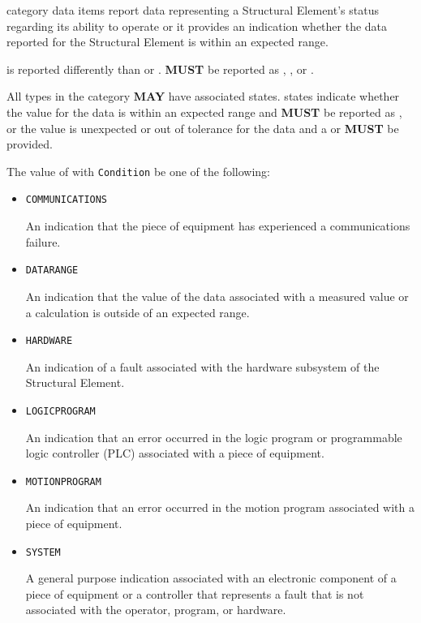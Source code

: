  category data items report data representing a \gls{Structural Element}’s status regarding its ability to operate or it provides an indication whether the data reported for the \gls{Structural Element} is within an expected range.

 is reported differently than  or .   \textbf{MUST} be reported as , , or .

All  types in the  category \textbf{MAY} have associated  states.   states indicate whether the value for the data is within an expected range and \textbf{MUST} be reported as , or the value is unexpected or out of tolerance for the data and a  or  \textbf{MUST} be provided.


The value of  with  \texttt{Condition} \MUST be one of the following:
\begin{itemize}


\item \texttt{COMMUNICATIONS}  

An indication that the piece of equipment has experienced a communications failure.


\item \texttt{DATA\textunderscore RANGE}  

An indication that the value of the data associated with a measured value or a calculation is outside of an expected range.


\item \texttt{HARDWARE}  

An indication of a fault associated with the hardware subsystem of the \gls{Structural Element}.


\item \texttt{LOGIC\textunderscore PROGRAM}  

An indication that an error occurred in the logic program or programmable logic controller (PLC) associated with a piece of equipment.


\item \texttt{MOTION\textunderscore PROGRAM}  

An indication that an error occurred in the motion program associated with a piece of equipment.


\item \texttt{SYSTEM}  

A general purpose indication associated with an electronic component of a piece of equipment or a controller that represents a fault that is not associated with the operator, program, or hardware.

\end{itemize}


